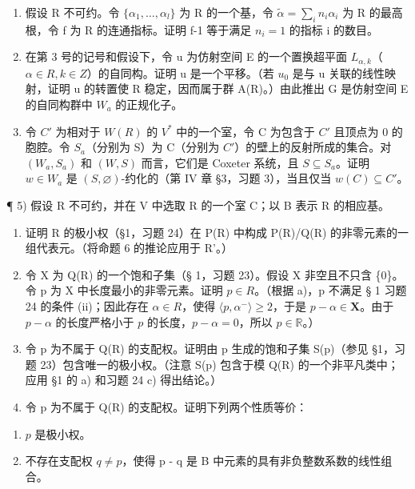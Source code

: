 \begin{enumerate}
\def\labelenumi{\arabic{enumi})}
\setcounter{enumi}{1}
\item
  假设 R 不可约。令 \(\{\alpha_{1},\ldots,\alpha_{l}\}\) 为 R 的一个基，令 \(\tilde{\alpha}=\sum_{i}n_{i}\alpha_{i}\) 为 R 的最高根，令 f 为 R 的连通指标。证明 f-1 等于满足 \(n_{i}=1\) 的指标 i 的数目。
\item
  在第 3 号的记号和假设下，令 u 为仿射空间 E 的一个置换超平面 \(L_{\alpha,k}\)（\(\alpha \in R, k \in Z\)）的自同构。证明 u 是一个平移。（若 \(u_{0}\) 是与 u 关联的线性映射，证明 u 的转置使 R 稳定，因而属于群 A(R)。）由此推出 G 是仿射空间 E 的自同构群中 \(W_{a}\) 的正规化子。
\item
  令 \(C'\) 为相对于 \(W(R)\) 的 \(V^{*}\) 中的一个室，令 C 为包含于 \(C'\) 且顶点为 0 的胞腔。令 \(S_{a}\)（分别为 S）为 C（分别为 \(C'\)）的壁上的反射所成的集合。对 \((W_{a}, S_{a})\) 和 \((W, S)\) 而言，它们是 Coxeter 系统，且 \(S \subseteq S_{a}\)。证明 \(w \in W_{a}\) 是 \((S, \varnothing)\)-约化的（第 IV 章 §3，习题 3），当且仅当 \(w(C) \subseteq C'\)。
\end{enumerate}

¶ 5) 假设 R 不可约，并在 V 中选取 R 的一个室 C；以 B 表示 R 的相应基。

\begin{enumerate}
\def\labelenumi{\alph{enumi})}
\item
  证明 R 的极小权（§1，习题 24）在 P(R) 中构成 P(R)/Q(R) 的非零元素的一组代表元。（将命题 6 的推论应用于 R'。）
\item
  令 X 为 Q(R) 的一个饱和子集（§ 1，习题 23）。假设 X 非空且不只含 \{0\}。令 p 为 X 中长度最小的非零元素。证明 \(p \in R\)。（根据 a)，p 不满足 § 1 习题 24 的条件 (ii)；因此存在 \(\alpha \in R\)，使得 \(\langle p, \alpha^{-} \rangle \geqslant 2\)，于是 \(p - \alpha \in \mathbf{X}\)。由于 \(p - \alpha\) 的长度严格小于 \(p\) 的长度，\(p - \alpha = 0\)，所以 \(p \in \mathbb{R}\)。）
\item
  令 p 为不属于 Q(R) 的支配权。证明由 p 生成的饱和子集 S(p)（参见 §1，习题 23）包含唯一的极小权。（注意 S(p) 包含于模 Q(R) 的一个非平凡类中；应用 §1 的 a) 和习题 24 c) 得出结论。）
\item
  令 p 为不属于 Q(R) 的支配权。证明下列两个性质等价：
\end{enumerate}

\begin{enumerate}
\def\labelenumi{(\roman{enumi})}
\item
  \(p\) 是极小权。
\item
  不存在支配权 \(q \neq p\)，使得 p - q 是 B 中元素的具有非负整数系数的线性组合。
\end{enumerate}

